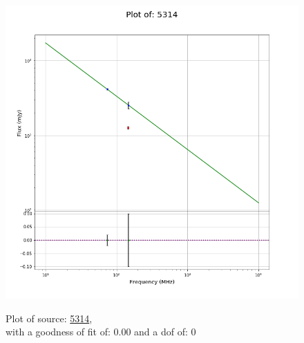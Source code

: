 \documentclass{article}
\begin{document}
\begin{figure}[H]
    \centering
    \begin{minipage}{.5\textwidth}
        \centering
        \includegraphics[scale = 0.35]{KmeulenSimSource_1hr/1hr5314.png}
        \captionsetup{labelformat=empty}
        \caption{Plot of source: \href{http://banana.transientskp.org/r4/vlo_KmeulenSimSource/runningcatalog/5314}{5314},\\with a goodness of fit of: 0.00 and a dof of: 0}
        \addtocounter{figure}{-1}
        \label{KmeulenSimSource:1hr:5314:plot}
    \end{minipage}%
    \begin{minipage}{0.5\textwidth}
        \centering


\end{minipage}
\end{figure}
\end{document}
